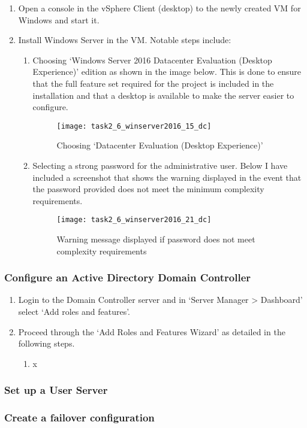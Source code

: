 \begin{enumerate}[resume*=task2methodology2]
  \item \label{task2:installwin2016server} Open a console in the vSphere Client (desktop) to the newly created VM for Windows and start it.
  \item Install Windows Server in the VM. Notable steps include:
    \begin{enumerate}[label=(\alph*)]
      \item Choosing `Windows Server 2016 Datacenter Evaluation (Desktop Experience)' edition as shown in the image below. This is done to ensure that the full feature set required for the project is included in the installation and that a desktop is available to make the server easier to configure.
        \begin{figure}[H]
          \centering
          \captionsetup{skip=2pt}
          \texttt{[image: task2\_6\_winserver2016\_15\_dc]}
          \caption{Choosing `Datacenter Evaluation (Desktop Experience)'}
          \label{fig:task2:vspherec_windc1}
        \end{figure}
      \item Selecting a strong password for the administrative user. Below I have included a screenshot that shows the warning displayed in the event that the password provided does not meet the minimum complexity requirements.
        \begin{figure}[H]
          \centering
          \captionsetup{skip=2pt}
          \texttt{[image: task2\_6\_winserver2016\_21\_dc]}
          \caption{Warning message displayed if password does not meet complexity requirements}
          \label{fig:task2:vspherec_windc2}
        \end{figure}
    \end{enumerate}
\end{enumerate}

\subsubsection{Configure an Active Directory Domain Controller}
\begin{enumerate}[series=task2methodology3]
  \item Login to the Domain Controller server and in `Server Manager > Dashboard' select `Add roles and features'.
  \item Proceed through the `Add Roles and Features Wizard' as detailed in the following steps.
   \begin{enumerate}[label=(\alph*)]
     \item x
   \end{enumerate}
\end{enumerate}


\subsubsection{Set up a User Server}
\subsubsection{Create a failover configuration}
